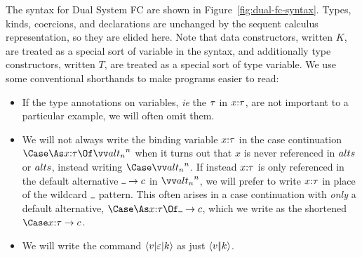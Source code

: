 \documentclass{article}
\begin{document}
The syntax for Dual System FC are shown in Figure~\ref{fig:dual-fc-syntax}.
Types, kinds, coercions, and declarations are unchanged by the sequent calculus
representation, so they are elided here.  Note that data constructors, written
$K$, are treated as a special sort of variable in the syntax, and additionally
type constructors, written $T$, are treated as a special sort of type variable.
We use some conventional shorthands to make programs easier to read:
\begin{itemize}
\item If the type annotations on variables, \emph{ie} the $\tau$ in $x{:}{\tau}$,
  are not important to a particular example, we will often omit them.


\item We will not always write the binding variable $x{:}{\tau}$ in the case
  continuation $\caseas{\ann x \ty}{\vect[n]{\analt_n}}$ when it turns out that
  $x$ is never referenced in $alts$ or $alts$, instead writing
  $\Case\vect[n]{\analt_n}$.  If instead $x{:}{\tau}$ is only referenced in the
  default alternative $\alt{\blank}{\cmd}$ in $\vect[n]{\analt_n}$, we will
  prefer to write $x{:}{\tau}$ in place of the wildcard $\blank$ pattern.  This
  often arises in a case continuation with \emph{only} a default alternative,
  $\caseas{\ann x \ty}{\alt{\blank}{\cmd}}$, which we write as the shortened
  $\Case\alt{\ann x \ty}{\cmd}$.

\item We will write the command $\braket{v | \varepsilon | k}$ as just
  $\left\langle{v}\middle|\!\middle|{k}\right\rangle$.


\end{itemize}
\end{document}
